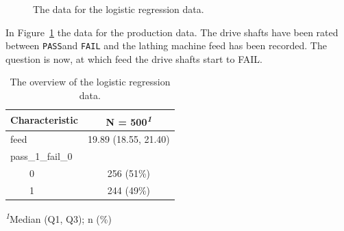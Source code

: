 \documentclass[
  a4paper,
]{scrbook}
\begin{document}
\begin{figure}[H]


\caption{\label{fig-logreg-data}The data for the logistic regression
data.}

\end{figure}%

In Figure~\ref{fig-logreg-data} the data for the production data. The
drive shafts have been rated between \texttt{PASS}and \texttt{FAIL} and
the lathing machine feed has been recorded. The question is now, at
which feed the drive shafts start to FAIL.

\begingroup
\fontsize{12.0pt}{14.4pt}\selectfont
\setlength{\LTpost}{0mm}

\begin{longtable}{lc}

\caption{\label{tbl-logreg-eda}The overview of the logistic regression
data.}

\tabularnewline

\toprule
\textbf{Characteristic} & \textbf{N = 500}\textsuperscript{\textit{1}} \\ 
\midrule\addlinespace[2.5pt]
feed & 19.89 (18.55, 21.40) \\ 
pass\_1\_fail\_0 &  \\ 
    0 & 256 (51\%) \\ 
    1 & 244 (49\%) \\ 
\bottomrule

\end{longtable}

\begin{minipage}{\linewidth}
\textsuperscript{\textit{1}}Median (Q1, Q3); n (\%)\\
\end{minipage}
\endgroup
\end{document}
